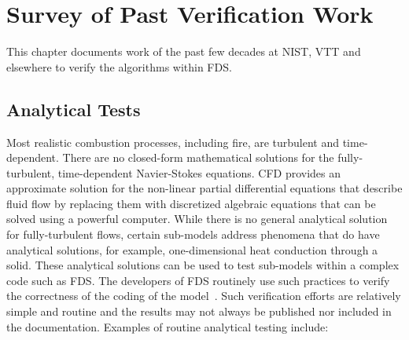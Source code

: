 \documentclass[11pt]{book}
\begin{document}
\chapter{Survey of Past Verification Work}

This chapter documents work of the past few decades at NIST, VTT and elsewhere to verify the algorithms within FDS.




\section{Analytical Tests}

\label{Analytical Tests}

Most realistic combustion processes, including fire, are turbulent and time-dependent. There are no closed-form mathematical solutions for the
fully-turbulent, time-dependent Navier-Stokes equations. CFD provides an approximate solution for the non-linear partial differential equations that describe fluid flow by
replacing them with discretized algebraic equations that can be solved using a powerful computer. While there is no general analytical solution for
fully-turbulent flows, certain sub-models address phenomena that do have analytical solutions, for example, one-dimensional heat conduction through
a solid. These analytical solutions can be used to test sub-models within a complex code such as FDS. The developers of FDS routinely use such
practices to verify the correctness of the coding of the model~\cite{Mell:1,McGrattan:4}. Such verification efforts are relatively simple and routine
and the results may not always be published nor included in the documentation. Examples of routine analytical testing include:
\end{document}
